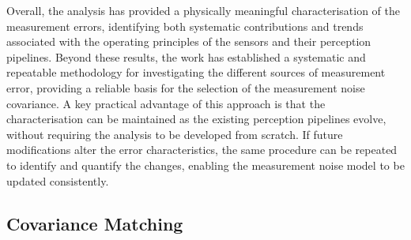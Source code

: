 Overall, the analysis has provided a physically meaningful characterisation of the
measurement errors, identifying both systematic contributions and trends associated with the
operating principles of the sensors and their perception pipelines. Beyond these results,
the work has established a systematic and repeatable methodology for investigating the
different sources of measurement error, providing a reliable basis for the selection of the
measurement noise covariance. A key practical advantage of this approach is that the
characterisation can be maintained as the existing perception pipelines evolve, without
requiring the analysis to be developed from scratch. If future modifications alter the
error characteristics, the same procedure can be repeated to identify and quantify the
changes, enabling the measurement noise model to be updated consistently.

\subsection{Covariance Matching}
\label{sec:adaptive_r}

